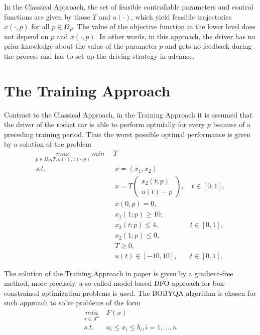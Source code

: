 In the Classical Approach, the set of feasible controllable parameters and control functions are given by those $T$ and $u(\cdot)$, which yield feasible trajectories $x(\cdot, p)$ for all $p \in \Omega_P$. The value of the objective function in the lower level does not depend on $p$ and $x(\cdot, p)$. In other words, in this approach, the driver has no prior knowledge about the value of the parameter $p$ and gets no feedback during the process and has to set up the driving strategy in advance. 

\section{The Training Approach}
Contrast to the Classical Approach, in the Training Approach it is assumed that the driver of the rocket car is able to perform optmially for every $p$ because of a preceding training period. Thus the worst possible optimal performance is given by a solution of the problem
\begin{subequations}
	\begin{align}
	   \underset{p \in \Omega_P, T, u(\cdot), x(\cdot,p)}{max}  \ 	\underset{}{min} \   & \  T \\ 
		s.t.  & \ \ x = (x_1, x_2)   \label{ta_rc_x} \\ 
             & \ \  \dot{x} = T  \begin{pmatrix}  x_2(t;p) \\ u(t)-p   \end{pmatrix}, & \ t \in [0,1],  \label{ta_rc_partial} \\
& \ \ x(0,p) = 0, \label{ta_rc_t0}\\
& \ \ x_1(1;p) \geq 10, \label{ta_rc_x1_t1} \\
& \ \ x_2(t;p) \leq 4, & t \in [0,1], \label{ta_rc_x2_tc} \\
& \ \ x_2(1;p) \leq 0, \label{ta_rc_x2_t1}  \\
& \ \ T \geq 0, \\
& \ \ u(t) \in [-10, 10], & t \in [0,1]. 
	\end{align}
	\label{TA_rc}
\end{subequations}

The solution of the Training Approach in paper \cite{MatSch22} is given by a gradient-free method, more precisely, a so-called model-based DFO approach for box-constrained optimization problems is used. The BOBYQA algorithm is chosen for such approach to solve problems of the form
\begin{equation}
	\begin{aligned}
		\underset{x \in \mathcal{R}^n}{min} & \  F(x)  \\ 
		s.t.  & \ a_i \leq x_i \leq b_i, i = 1, ..., n \\
	\end{aligned}
	\label{DFO_bc}
\end{equation}

